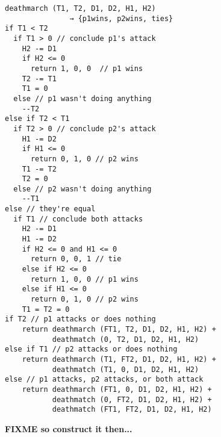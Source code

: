 \begin{lstlisting}[caption={Death march simulation pseudocode},label={list:deathmarch}]
deathmarch (T1, T2, D1, D2, H1, H2)
               → {p1wins, p2wins, ties}
if T1 < T2
  if T1 > 0 // conclude p1's attack
    H2 -= D1
    if H2 <= 0
      return 1, 0, 0  // p1 wins
    T2 -= T1
    T1 = 0
  else // p1 wasn't doing anything
    --T2
else if T2 < T1
  if T2 > 0 // conclude p2's attack
    H1 -= D2
    if H1 <= 0
      return 0, 1, 0 // p2 wins
    T1 -= T2
    T2 = 0
  else // p2 wasn't doing anything
    --T1
else // they're equal
  if T1 // conclude both attacks
    H2 -= D1
    H1 -= D2
    if H2 <= 0 and H1 <= 0
      return 0, 0, 1 // tie
    else if H2 <= 0
      return 1, 0, 0 // p1 wins
    else if H1 <= 0
      return 0, 1, 0 // p2 wins
    T1 = T2 = 0
if T2 // p1 attacks or does nothing
    return deathmarch (FT1, T2, D1, D2, H1, H2) +
           deathmatch (0, T2, D1, D2, H1, H2)
else if T1 // p2 attacks or does nothing
    return deathmarch (T1, FT2, D1, D2, H1, H2) +
           deathmatch (T1, 0, D1, D2, H1, H2)
else // p1 attacks, p2 attacks, or both attack
    return deathmarch (FT1, 0, D1, D2, H1, H2) +
           deathmatch (0, FT2, D1, D2, H1, H2) +
           deathmatch (FT1, FT2, D1, D2, H1, H2)
\end{lstlisting}

\textbf{FIXME so construct it then...}

